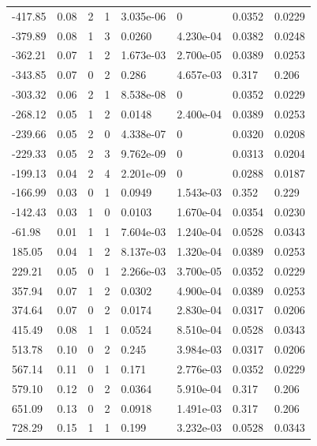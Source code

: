 \documentclass[preview]{standalone}
\begin{document}
{{\begin{tabular}{L{1.2cm}C{1.2cm} C{0.3cm}C{0.5cm} C{1.4cm}C{1.4cm} C{1.4cm}C{1.4cm}}
  -417.85  &  0.08  & 2     &  1 &  3.035e-06  & 0  & 0.0352 &  0.0229   \\ 
  -379.89  &  0.08  & 1     &  3 &  0.0260  & 4.230e-04  & 0.0382 &  0.0248   \\ 
  -362.21  &  0.07  & 1     &  2 &  1.673e-03  & 2.700e-05  & 0.0389 &  0.0253   \\ 
  -343.85  &  0.07  & 0     &  2 &  0.286  & 4.657e-03  & 0.317 &  0.206   \\ 
  -303.32  &  0.06  & 2     &  1 &  8.538e-08  & 0  & 0.0352 &  0.0229   \\ 
  -268.12  &  0.05  & 1     &  2 &  0.0148  & 2.400e-04  & 0.0389 &  0.0253   \\ 
  -239.66  &  0.05  & 2     &  0 &  4.338e-07  & 0  & 0.0320 &  0.0208   \\ 
  -229.33  &  0.05  & 2     &  3 &  9.762e-09  & 0  & 0.0313 &  0.0204   \\ 
  -199.13  &  0.04  & 2     &  4 &  2.201e-09  & 0  & 0.0288 &  0.0187   \\ 
  -166.99  &  0.03  & 0     &  1 &  0.0949  & 1.543e-03  & 0.352 &  0.229   \\ 
  -142.43  &  0.03  & 1     &  0 &  0.0103  & 1.670e-04  & 0.0354 &  0.0230   \\ 
  -61.98  &  0.01  & 1     &  1 &  7.604e-03  & 1.240e-04  & 0.0528 &  0.0343   \\ 
  185.05  &  0.04  & 1     &  2 &  8.137e-03  & 1.320e-04  & 0.0389 &  0.0253   \\ 
  229.21  &  0.05  & 0     &  1 &  2.266e-03  & 3.700e-05  & 0.0352 &  0.0229   \\ 
  357.94  &  0.07  & 1     &  2 &  0.0302  & 4.900e-04  & 0.0389 &  0.0253   \\ 
  374.64  &  0.07  & 0     &  2 &  0.0174  & 2.830e-04  & 0.0317 &  0.0206   \\ 
  415.49  &  0.08  & 1     &  1 &  0.0524  & 8.510e-04  & 0.0528 &  0.0343   \\ 
  513.78  &  0.10  & 0     &  2 &  0.245  & 3.984e-03  & 0.0317 &  0.0206   \\ 
  567.14  &  0.11  & 0     &  1 &  0.171  & 2.776e-03  & 0.0352 &  0.0229   \\ 
  579.10  &  0.12  & 0     &  2 &  0.0364  & 5.910e-04  & 0.317 &  0.206   \\ 
  651.09  &  0.13  & 0     &  2 &  0.0918  & 1.491e-03  & 0.317 &  0.206   \\ 
  728.29  &  0.15  & 1     &  1 &  0.199  & 3.232e-03  & 0.0528 &  0.0343   \\ 

\end{tabular}}}
\end{document}
